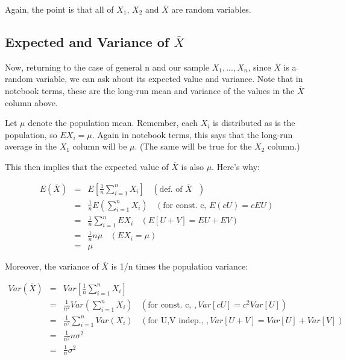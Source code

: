 Again, the point is that all of $X_1$, $X_2$ and $\overline{X}$ are
random variables.

\subsection{Expected and Variance of $\overline{X}$}

Now, returning to the case of general n and our sample
$X_1,...,X_n$, since $\overline{X}$ is a random variable, we can ask
about its expected value and variance.  Note that in notebook terms,
these are the long-run mean and variance of the values in the
$\overline{X}$ column above.

Let $\mu$ denote the population mean.  Remember, each $X_i$ is
distributed as is the population, so $EX_i = \mu$.  Again in notebook
terms, this says that the long-run average in the $X_1$ column will be
$\mu$.  (The same will be true for the $X_2$ column.)

This then implies that the expected value of $\overline{X}$ is also
$\mu$.  Here's why:

\begin{eqnarray}
E(\overline{X}) 
&=& E \left [ \frac{1}{n} \sum_{i=1}^n X_i \right ] ~~~~ (\textrm{def.
   of $\overline{X}$ }) \\
&=& \frac{1}{n} E \left ( \sum_{i=1}^{n} X_i \right ) ~~~~ (\textrm{for
const. c, } E(cU) = cEU) \\
&=& \frac{1}{n} \sum_{i=1}^{n} EX_i ~~~~ (E[U+V] = EU + EV) \\
&=& \frac{1}{n} n \mu  ~~~~ (EX_i = \mu) \\
&=& \mu
\label{barmean}
\end{eqnarray}

Moreover, the variance of $\overline{X}$ is 1/n times the population
variance:

\begin{eqnarray}
Var(\overline{X}) &=& Var \left [ \frac{1}{n} \sum_{i=1}^n X_i \right ] \\
&=& \frac{1}{n^2} Var \left ( \sum_{i=1}^{n} X_i \right ) ~~~~
(\textrm{for const. c, }, Var[cU] = c^2Var[U]) \\
&=& \frac{1}{n^2} \sum_{i=1}^{n} Var(X_i)  ~~~~
(\textrm{for U,V indep., }, Var[U+V] = Var[U]+Var[V]) \\
&=& \frac{1}{n^2} n \sigma^2  \\
&=& \frac{1}{n} \sigma^2
\label{oneovernpopvar}
\end{eqnarray}

